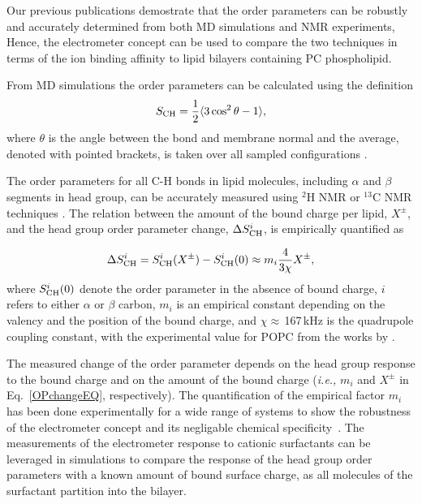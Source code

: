 Our previous publications \citep{catte16,ollila16} demostrate that
the order parameters can be robustly and accurately determined from both MD simulations and  NMR experiments, 
Hence, the electrometer concept can be used to compare the two techniques
in terms of the ion binding affinity to lipid bilayers containing PC phospholipid. 

From MD simulations the order parameters can be calculated using the definition
\begin{equation}\label{OP} 
S_{\rm CH}=\frac{1}{2}\langle 3\cos^2\theta -1 \rangle, 
\end{equation} 
where $\theta$ is the angle between the bond and membrane
normal and the average, denoted with pointed brackets, is taken over all sampled configurations \citep{ollila16}.

The order parameters for all C-H bonds in lipid molecules, including
$\alpha$ and $\beta$ segments in head group, can be accurately measured
using $^2$H NMR or $^{13}$C NMR techniques \citep{ollila16}. 
The relation between the amount of the bound charge per lipid,  $X^\pm$, and
the head group order parameter change, $\Delta S_{\rm{CH}}^{i}$,
is empirically quantified as~\cite{seelig87,ferreira16}

\begin{equation}\label{OPchangeEQ} 
\Delta S_{\rm{CH}}^{i}= S_{\rm{CH}}^{i}(X^\pm)-S_{\rm{CH}}^{i}(0) \approx m_i \frac{4 }{3\chi}X^\pm, 
\end{equation} 
where $S_{\rm{CH}}^{i}(0)$ denote the order parameter in the absence of bound charge,
$i$ refers to either $\alpha$ or $\beta$ carbon,
$m_i$ is an empirical constant depending on the valency and the position of the bound charge,
and $\chi \approx$\,167\,kHz is the quadrupole coupling constant, 
with the experimental value for POPC from the works by \citet{seelig77,Davis83}.

The measured change of the order parameter depends on the head group response to the bound charge 
and on the amount of the bound charge (\textit{i.e.,} $m_i$ and $X^\pm$ in Eq.~\ref{OPchangeEQ}, respectively).  
The quantification of the empirical factor $m_i$ has been done experimentally for a wide range of systems
to show the robustness of the electrometer concept and its negligable chemical specificity~\citep{seelig87, beschiasvili91}. 
The measurements of the electrometer response to cationic surfactants 
can be leveraged in simulations to compare the response of the head group order parameters 
with a known amount of bound surface charge,
as all molecules of the surfactant partition into the bilayer. 


